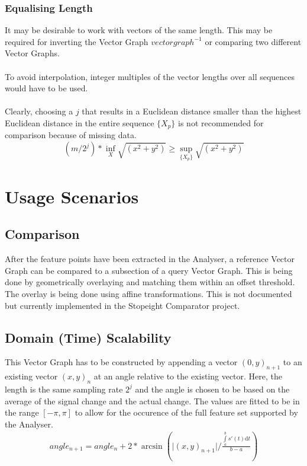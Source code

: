 \documentclass{report}
\begin{document}
\subsection{Equalising Length}
It may be desirable to work with vectors of the same length. This may be required for inverting the Vector Graph $vectorgraph^{-1}$ or comparing two different Vector Graphs.\\\\
To avoid interpolation, integer multiples of the vector lengths over all sequences would have to be used.\\\\
Clearly, choosing a $j$ that results in a Euclidean distance smaller than the highest Euclidean distance in the entire sequence $\{X_{p}\}$ is not recommended for comparison because of missing data.
\begin{equation}
(m/2^j)*\inf \limits _{X} \sqrt{(x^2+y^2)} \geq \sup \limits _{\{X_{p}\}} \sqrt{(x^2+y^2)}
\end{equation}

\chapter{Usage Scenarios}
\section{Comparison}
After the feature points have been extracted in the Analyser, a reference Vector Graph can be compared to a subsection of a query Vector Graph. This is being done by geometrically overlaying and matching them within an offset threshold. The overlay is being done using affine transformations. This is not documented but currently implemented in the Stopeight Comparator project.
\section{Domain (Time) Scalability}
This Vector Graph has to be constructed by appending a vector $(0,y)_{n+1}$ to an existing vector $(x,y)_{n}$ at an angle relative to the existing vector. Here, the length is the same sampling rate $2^j$ and the angle is chosen to be based on the average of the signal change and the actual change. The values are fitted to be in the range $[-\pi,\pi]$ to allow for the occurence of the full feature set supported by the Analyser.
\begin{align}
angle_{n+1}=angle_{n}+2*\arcsin(\vert(x,y)_{n+1}\vert/\frac{\int \limits _{a}^{b} s'(t) \mathrm{d}t}{b-a})
\end{align}
\end{document}
